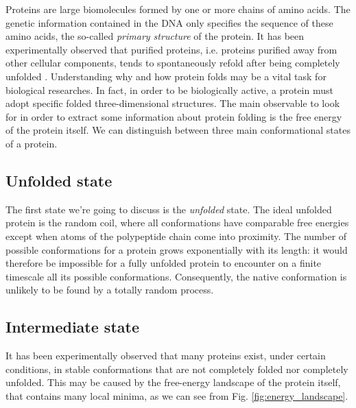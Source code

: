 Proteins are large biomolecules formed by one or more chains of amino acids.
The genetic information contained in the DNA only specifies the sequence of these amino acids, the so-called \emph{primary structure} of the protein.
It has been experimentally observed that purified proteins, i.e. proteins purified away from other cellular components, tends to spontaneously refold after being completely unfolded \cite{ProteinFolding1990}.
Understanding why and how protein folds may be a vital task for biological researches.
In fact, in order to be biologically active, a protein must adopt specific folded three-dimensional structures.
The main observable to look for in order to extract some information about protein folding is the free energy of the protein itself.
We can distinguish between three main conformational states of a protein.

\subsection{Unfolded state}
The first state we're going to discuss is the \emph{unfolded} state.
The ideal unfolded protein is the random coil, where all conformations have comparable free energies except when atoms of the polypeptide chain come into proximity.
The number of possible conformations for a protein grows exponentially with its length: it would therefore be impossible for a fully unfolded protein to encounter on a finite timescale all its possible conformations.
Consequently, the native conformation is unlikely to be found by a totally random process.

\subsection{Intermediate state}
It has been experimentally observed that many proteins exist, under certain conditions, in stable conformations that are not completely folded nor completely unfolded.
This may be caused by the free-energy landscape of the protein itself, that contains many local minima, as we can see from Fig. \ref{fig:energy_landscape}.

